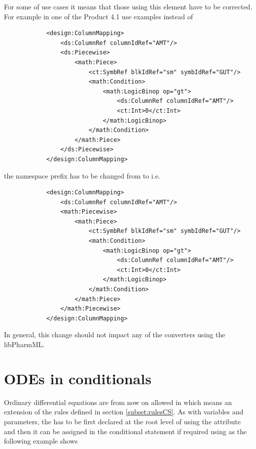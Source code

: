 \smallskip
For some of use cases it means that those using this element have to be corrected.
For example in one of the Product 4.1 use examples instead of
\lstset{language=XML}
\begin{lstlisting}
			<design:ColumnMapping>
				<ds:ColumnRef columnIdRef="AMT"/>
				<ds:Piecewise>
					<math:Piece>
						<ct:SymbRef blkIdRef="sm" symbIdRef="GUT"/>
						<math:Condition>
							<math:LogicBinop op="gt">
								<ds:ColumnRef columnIdRef="AMT"/>
								<ct:Int>0</ct:Int>
							</math:LogicBinop>
						</math:Condition>
					</math:Piece>
				</ds:Piecewise>
			</design:ColumnMapping>
\end{lstlisting}
the namespace prefix has to be changed from  to  i.e. 
\lstset{language=XML}
\begin{lstlisting}
			<design:ColumnMapping>
				<ds:ColumnRef columnIdRef="AMT"/>
				<math:Piecewise>
					<math:Piece>
						<ct:SymbRef blkIdRef="sm" symbIdRef="GUT"/>
						<math:Condition>
							<math:LogicBinop op="gt">
								<ds:ColumnRef columnIdRef="AMT"/>
								<ct:Int>0</ct:Int>
							</math:LogicBinop>
						</math:Condition>
					</math:Piece>
				</math:Piecewise>
			</design:ColumnMapping>

\end{lstlisting}
In general, this change should not impact any of the converters using the libPharmML.



\section{ODEs in conditionals}
\label{sec:ODEinCS}

Ordinary differential equations are from now on allowed in  
which means an extension of the rules defined in section \ref{subset:rulesCS}.
As with variables and parameters, the  has to be 
first declared at the root level of  using the attribute  
and then it can be assigned in the conditional statement if required using 
as the following example shows

